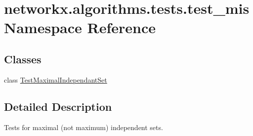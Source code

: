\hypertarget{namespacenetworkx_1_1algorithms_1_1tests_1_1test__mis}{}\section{networkx.\+algorithms.\+tests.\+test\+\_\+mis Namespace Reference}
\label{namespacenetworkx_1_1algorithms_1_1tests_1_1test__mis}
\subsection*{Classes}
\begin{DoxyCompactItemize}
\item 
class \hyperlink{classnetworkx_1_1algorithms_1_1tests_1_1test__mis_1_1TestMaximalIndependantSet}{Test\+Maximal\+Independant\+Set}
\end{DoxyCompactItemize}


\subsection{Detailed Description}
\begin{DoxyVerb}Tests for maximal (not maximum) independent sets.\end{DoxyVerb}
 